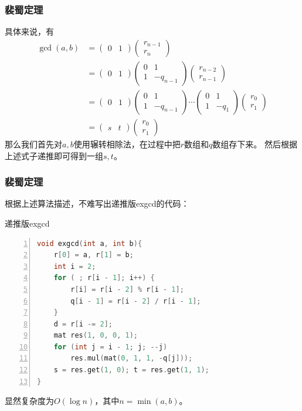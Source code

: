 \documentclass{ctexbeamer}        %
\begin{document}
\begin{frame}[fragile]
\frametitle{裴蜀定理}
具体来说，有
\begin{align*}
    \gcd(a,b)&=\begin{pmatrix} 0 & 1 \end{pmatrix} \begin{pmatrix} r_{n-1} \\ r_n \end{pmatrix} \\
    &=\begin{pmatrix} 0 & 1 \end{pmatrix} \begin{pmatrix} 0 & 1 \\ 1 & -q_{n-1} \end{pmatrix} \begin{pmatrix} r_{n-2} \\ r_{n-1} \end{pmatrix}\\
    &=\begin{pmatrix} 0 & 1 \end{pmatrix} \begin{pmatrix} 0 & 1 \\ 1 & -q_{n-1} \end{pmatrix} \cdots \begin{pmatrix} 0 & 1 \\ 1 & -q_1 \end{pmatrix} \begin{pmatrix} r_0 \\ r_1 \end{pmatrix}\\
    &=\begin{pmatrix} s & t \end{pmatrix} \begin{pmatrix} r_0 \\ r_1 \end{pmatrix}
\end{align*}
那么我们首先对$a,b$使用辗转相除法，在过程中把$r$数组和$q$数组存下来。
然后根据上述式子递推即可得到一组$s,t$。
\end{frame}

\begin{frame}[fragile]
\frametitle{裴蜀定理}

根据上述算法描述，不难写出递推版exgcd的代码：
\begin{block}{递推版exgcd}
\begin{lstlisting}[language={c++},
                   numbers=left]
void exgcd(int a, int b){
    r[0] = a, r[1] = b;
    int i = 2;
    for ( ; r[i - 1]; i++) {
        r[i] = r[i - 2] % r[i - 1];
        q[i - 1] = r[i - 2] / r[i - 1];
    }
    d = r[i -= 2];
    mat res(1, 0, 0, 1);
    for (int j = i - 1; j; --j)
        res.mul(mat(0, 1, 1, -q[j]));
    s = res.get(1, 0); t = res.get(1, 1);
}
\end{lstlisting}
\end{block}
显然复杂度为$O(\log n)$，其中$n=\min(a,b)$。
\end{frame}
\end{document}
